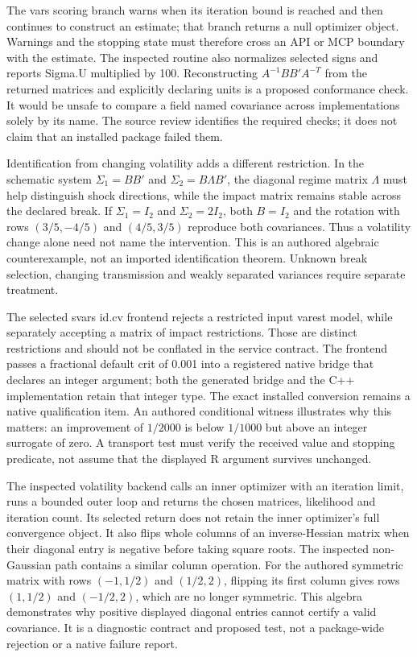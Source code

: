 The vars scoring branch warns when its iteration bound is reached and then continues to construct an estimate; that branch returns a null optimizer object. Warnings and the stopping state must therefore cross an API or MCP boundary with the estimate. The inspected routine also normalizes selected signs and reports Sigma.U multiplied by 100. Reconstructing $A^{-1}BB'A^{-T}$ from the returned matrices and explicitly declaring units is a proposed conformance check. It would be unsafe to compare a field named covariance across implementations solely by its name. The source review identifies the required checks; it does not claim that an installed package failed them.~\citep{exec25_rdyn_vars}

Identification from changing volatility adds a different restriction. In the schematic system $\Sigma_1=BB'$ and $\Sigma_2=B\Lambda B'$, the diagonal regime matrix $\Lambda$ must help distinguish shock directions, while the impact matrix remains stable across the declared break. If $\Sigma_1=I_2$ and $\Sigma_2=2I_2$, both $B=I_2$ and the rotation with rows $(3/5,-4/5)$ and $(4/5,3/5)$ reproduce both covariances. Thus a volatility change alone need not name the intervention. This is an authored algebraic counterexample, not an imported identification theorem. Unknown break selection, changing transmission and weakly separated variances require separate treatment.~\citep{exec25_rdyn_choice}

The selected svars id.cv frontend rejects a restricted input varest model, while separately accepting a matrix of impact restrictions. Those are distinct restrictions and should not be conflated in the service contract. The frontend passes a fractional default crit of 0.001 into a registered native bridge that declares an integer argument; both the generated bridge and the C++ implementation retain that integer type. The exact installed conversion remains a native qualification item. An authored conditional witness illustrates why this matters: an improvement of $1/2000$ is below $1/1000$ but above an integer surrogate of zero. A transport test must verify the received value and stopping predicate, not assume that the displayed R argument survives unchanged.~\citep{exec25_rdyn_svars,exec25_rdyn_choice}

The inspected volatility backend calls an inner optimizer with an iteration limit, runs a bounded outer loop and returns the chosen matrices, likelihood and iteration count. Its selected return does not retain the inner optimizer's full convergence object. It also flips whole columns of an inverse-Hessian matrix when their diagonal entry is negative before taking square roots. The inspected non-Gaussian path contains a similar column operation. For the authored symmetric matrix with rows $(-1,1/2)$ and $(1/2,2)$, flipping its first column gives rows $(1,1/2)$ and $(-1/2,2)$, which are no longer symmetric. This algebra demonstrates why positive displayed diagonal entries cannot certify a valid covariance. It is a diagnostic contract and proposed test, not a package-wide rejection or a native failure report.~\citep{exec25_rdyn_svars,exec25_rdyn_choice}

